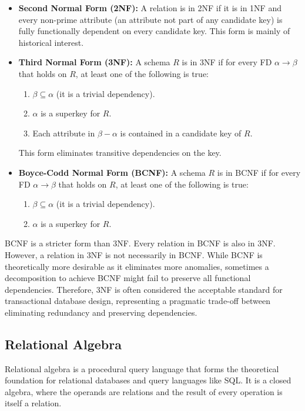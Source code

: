 \begin{itemize}
    \item \textbf{Second Normal Form (2NF):} A relation is in 2NF if it is in 1NF and every non-prime attribute (an attribute not part of any candidate key) is fully functionally dependent on every candidate key. This form is mainly of historical interest.
    \item \textbf{Third Normal Form (3NF):} A schema $R$ is in 3NF if for every FD $\alpha \to \beta$ that holds on $R$, at least one of the following is true:
    \begin{enumerate}
        \item $\beta \subseteq \alpha$ (it is a trivial dependency).
        \item $\alpha$ is a superkey for $R$.
        \item Each attribute in $\beta - \alpha$ is contained in a candidate key of $R$.
    \end{enumerate}
    This form eliminates transitive dependencies on the key.
    \item \textbf{Boyce-Codd Normal Form (BCNF):} A schema $R$ is in BCNF if for every FD $\alpha \to \beta$ that holds on $R$, at least one of the following is true:
    \begin{enumerate}
        \item $\beta \subseteq \alpha$ (it is a trivial dependency).
        \item $\alpha$ is a superkey for $R$.
    \end{enumerate}
\end{itemize}
\begin{remark}
BCNF is a stricter form than 3NF. Every relation in BCNF is also in 3NF. However, a relation in 3NF is not necessarily in BCNF. While BCNF is theoretically more desirable as it eliminates more anomalies, sometimes a decomposition to achieve BCNF might fail to preserve all functional dependencies. Therefore, 3NF is often considered the acceptable standard for transactional database design, representing a pragmatic trade-off between eliminating redundancy and preserving dependencies.
\end{remark}

\subsection{Relational Algebra}
Relational algebra is a procedural query language that forms the theoretical foundation for relational databases and query languages like SQL. It is a closed algebra, where the operands are relations and the result of every operation is itself a relation.

